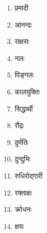 \begin{multicols}{2}
\begin{enumerate}
\item प्रमादी 
\item आनन्दः 
\item राक्षसः 
\item नलः 
\item पिङ्गलः 
\item कालयुक्तिः 
\item सिद्धार्थी 
\item रौद्रः 
\item दुर्मतिः 
\item दुन्दुभिः 
\item रुधिरोद्गारी 
\item रक्ताक्षः 
\item क्रोधनः 
\item क्षयः
\end{enumerate}
\end{multicols}